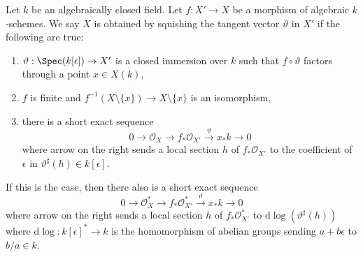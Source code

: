 \begin{example}
\label{example-squish-tangent-vector}
Let $k$ be an algebraically closed field. Let $f : X' \to X$
be a morphism of algebraic $k$-schemes. We say $X$ is
obtained by squishing the tangent vector $\vartheta$ in $X'$
if the following are true:
\begin{enumerate}
\item $\vartheta : \Spec(k[\epsilon]) \to X'$ is a closed immersion
over $k$ such that $f \circ \vartheta$ factors through a point $x \in X(k)$,
\item $f$ is finite and
$f^{-1}(X \setminus \{x\}) \to X \setminus \{x\}$ is an isomorphism,
\item there is a short exact sequence
$$
0 \to \mathcal{O}_X \to f_*\mathcal{O}_{X'} \xrightarrow{\vartheta} x_*k \to 0
$$
where arrow on the right sends a local section $h$ of $f_*\mathcal{O}_{X'}$
to the coefficient of $\epsilon$ in $\vartheta^\sharp(h) \in k[\epsilon]$.
\end{enumerate}
If this is the case, then there also is a short exact sequence
$$
0 \to \mathcal{O}_X^* \to f_*\mathcal{O}_{X'}^*
\xrightarrow{\vartheta} x_*k \to 0
$$
where arrow on the right sends a local section $h$ of $f_*\mathcal{O}_{X'}^*$
to $\text{d}\log(\vartheta^\sharp(h))$ where
$\text{d}\log : k[\epsilon]^* \to k$
is the homomorphism of abelian groups sending $a + b\epsilon$ to $b/a \in k$.
\end{example}